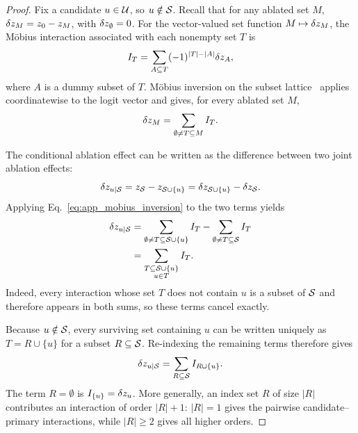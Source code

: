 \begin{proof}
Fix a candidate $u\in\mathcal{U}$, so $u\notin\mathcal{S}$.
Recall that for any ablated set $M$,
$\delta z_M=z_0-z_M$, with $\delta z_\emptyset=0$.
For the vector-valued set function $M\mapsto\delta z_M$, the M\"obius interaction
associated with each nonempty set $T$ is
\begin{equation}
I_T
=
\sum_{A\subseteq T}
(-1)^{|T|-|A|}\delta z_A ,
\label{eq:app_mobius_transform}
\end{equation}
where $A$ is a dummy subset of $T$.
M\"obius inversion on the subset lattice~\citep{rota1964foundations} applies
coordinatewise to the logit vector and gives, for every ablated set $M$,
\begin{equation}
\delta z_M
=
\sum_{\emptyset\neq T\subseteq M} I_T .
\label{eq:app_mobius_inversion}
\end{equation}

The conditional ablation effect can be written as the difference between two
joint ablation effects:
\begin{equation}
\delta z_{u\mid\mathcal{S}}
=
z_{\mathcal{S}}-z_{\mathcal{S}\cup\{u\}}
=
\delta z_{\mathcal{S}\cup\{u\}}-\delta z_{\mathcal{S}} .
\label{eq:app_conditional_difference}
\end{equation}
Applying Eq.~\ref{eq:app_mobius_inversion} to the two terms yields
\begin{equation}
\begin{aligned}
\delta z_{u\mid\mathcal{S}}
&=
\sum_{\emptyset\neq T\subseteq\mathcal{S}\cup\{u\}} I_T
-
\sum_{\emptyset\neq T\subseteq\mathcal{S}} I_T \\
&=
\sum_{\substack{T\subseteq\mathcal{S}\cup\{u\}\\u\in T}} I_T .
\end{aligned}
\label{eq:app_exact_cancel}
\end{equation}
Indeed, every interaction whose set $T$ does not contain $u$ is a subset of
$\mathcal{S}$ and therefore appears in both sums, so these terms cancel exactly.

Because $u\notin\mathcal{S}$, every surviving set containing $u$ can be written
uniquely as
$T=R\cup\{u\}$ for a subset $R\subseteq\mathcal{S}$.
Re-indexing the remaining terms therefore gives
\begin{equation}
\delta z_{u\mid\mathcal{S}}
=
\sum_{R\subseteq\mathcal{S}} I_{R\cup\{u\}} .
\label{eq:app_exact_reindex}
\end{equation}
The term $R=\emptyset$ is
$I_{\{u\}}=\delta z_u$.
More generally, an index set $R$ of size $|R|$ contributes an interaction of
order $|R|+1$: $|R|=1$ gives the pairwise candidate--primary interactions,
while $|R|\geq2$ gives all higher orders.


\end{proof}
